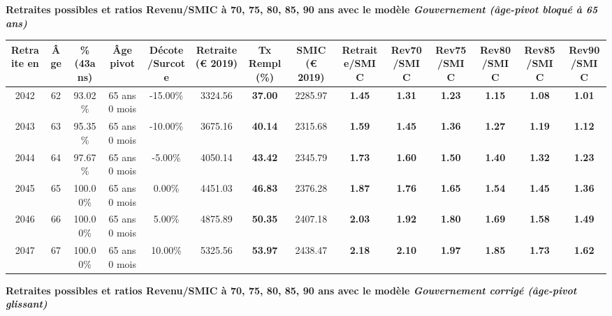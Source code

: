 {\bf \noindent Retraites possibles et ratios Revenu/SMIC à 70, 75, 80, 85, 90 ans avec le modèle \emph{Gouvernement (âge-pivot bloqué à 65 ans)}}  
 
\begin{adjustbox}{max width=\textwidth} 
\begin{tabular}[htb]{|c|c||c|c|c||c|c||c||c|c|c|c|c|c|} 
\hline 
 Retraite en &  Âge &  \%(43ans) &  Âge pivot &  Décote/Surcote &  Retraite (\euro{} 2019) &  Tx Rempl(\%) &  SMIC (\euro{} 2019) &  Retraite/SMIC &  Rev70/SMIC &  Rev75/SMIC &  Rev80/SMIC &  Rev85/SMIC &  Rev90/SMIC \\ 
\hline \hline 
 2042 &  62 &  93.02\% &  65 ans 0 mois &  -15.00\% &  3324.56 &  {\bf 37.00} &  2285.97 &  {\bf 1.45} &  {\bf 1.31} &  {\bf 1.23} &  {\bf 1.15} &  {\bf 1.08} &  {\bf 1.01} \\ 
\hline 
 2043 &  63 &  95.35\% &  65 ans 0 mois &  -10.00\% &  3675.16 &  {\bf 40.14} &  2315.68 &  {\bf 1.59} &  {\bf 1.45} &  {\bf 1.36} &  {\bf 1.27} &  {\bf 1.19} &  {\bf 1.12} \\ 
\hline 
 2044 &  64 &  97.67\% &  65 ans 0 mois &  -5.00\% &  4050.14 &  {\bf 43.42} &  2345.79 &  {\bf 1.73} &  {\bf 1.60} &  {\bf 1.50} &  {\bf 1.40} &  {\bf 1.32} &  {\bf 1.23} \\ 
\hline 
 2045 &  65 &  100.00\% &  65 ans 0 mois &  0.00\% &  4451.03 &  {\bf 46.83} &  2376.28 &  {\bf 1.87} &  {\bf 1.76} &  {\bf 1.65} &  {\bf 1.54} &  {\bf 1.45} &  {\bf 1.36} \\ 
\hline 
 2046 &  66 &  100.00\% &  65 ans 0 mois &  5.00\% &  4875.89 &  {\bf 50.35} &  2407.18 &  {\bf 2.03} &  {\bf 1.92} &  {\bf 1.80} &  {\bf 1.69} &  {\bf 1.58} &  {\bf 1.49} \\ 
\hline 
 2047 &  67 &  100.00\% &  65 ans 0 mois &  10.00\% &  5325.56 &  {\bf 53.97} &  2438.47 &  {\bf 2.18} &  {\bf 2.10} &  {\bf 1.97} &  {\bf 1.85} &  {\bf 1.73} &  {\bf 1.62} \\ 
\hline 
\hline 
\end{tabular} 
\end{adjustbox} 
 
 \vspace{0.1cm} 
{\bf \noindent Retraites possibles et ratios Revenu/SMIC à 70, 75, 80, 85, 90 ans avec le modèle \emph{Gouvernement corrigé (âge-pivot glissant)}}  
 
